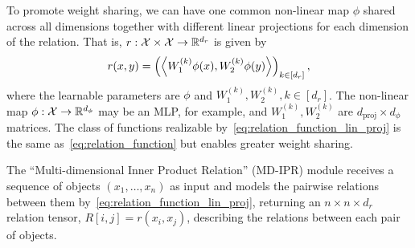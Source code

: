 To promote weight sharing, we can have one common non-linear map $\phi$ shared across all dimensions together with different linear projections for each dimension of the relation. That is, $r: {\mathcal{X}} \times {\mathcal{X}} \to \mathbb{R}^{d_r}$ is given by
\begin{equation}\label{eq:relation_function_lin_proj}
    r(x, y) = \left(\left \langle W_1^{(k)}\phi(x), W_2^{(k)}\phi(y) \right\rangle\right)_{k \in [d_r]},
\end{equation}
where the learnable parameters are $\phi$ and $W_1^{(k)}, W_2^{(k)}, k \in [d_r]$. The non-linear map $\phi: {\mathcal{X}} \to \mathbb{R}^{d_\phi}$ may be an MLP, for example, and $W_1^{(k)}, W_2^{(k)}$ are $d_{\mathrm{proj}} \times d_\phi$ matrices. The class of functions realizable by~\cref{eq:relation_function_lin_proj} is the same as~\cref{eq:relation_function} but enables greater weight sharing.

The ``Multi-dimensional Inner Product Relation'' (MD-IPR) module receives a sequence of objects $(x_1, \ldots, x_n)$ as input and models the pairwise relations between them by~\cref{eq:relation_function_lin_proj}, returning an $n \times n \times d_r$ relation tensor, $R[i,j] = r(x_i, x_j)$, describing the relations between each pair of objects.

% 